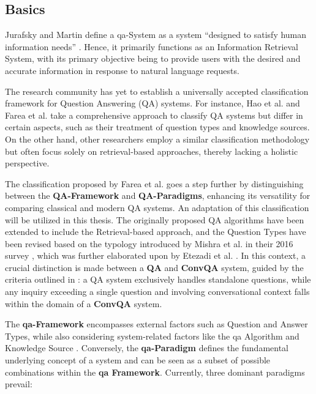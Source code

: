 \subsection{Basics}
\label{subsec:qa_basics}

Jurafsky and Martin define a \gls{qa}-System as a system \enquote{designed to satisfy human information needs} \cite{jurafsky_speech_2023}. Hence, it primarily functions as an Information Retrieval System, with its primary objective being to provide users with the desired and accurate information in response to natural language requests.

The research community has yet to establish a universally accepted classification framework for Question Answering (QA) systems. For instance, Hao et al. and Farea et al. \cite{hao_recent_2022, farea_evaluation_2022} take a comprehensive approach to classify QA systems but differ in certain aspects, such as their treatment of question types and knowledge sources. On the other hand, other researchers \cite{zhu_retrieving_2021, jurafsky_speech_2023, etezadi_state_2023, zhang_survey_2023} employ a similar classification methodology but often focus solely on retrieval-based approaches, thereby lacking a holistic perspective.

The classification proposed by Farea et al. \cite{farea_evaluation_2022} goes a step further by distinguishing between the \textbf{QA-Framework} and \textbf{QA-Paradigms}, enhancing its versatility for comparing classical and modern QA systems. An adaptation of this classification will be utilized in this thesis. The originally proposed QA algorithms have been extended to include the Retrieval-based approach, and the Question Types have been revised based on the typology introduced by Mishra et al. in their 2016 survey \cite{mishra_survey_2016}, which was further elaborated upon by Etezadi et al. \cite{etezadi_state_2023}. In this context, a crucial distinction is made between a \textbf{QA} and \textbf{ConvQA} system, guided by the criteria outlined in \cite{zamani_conversational_2023}: a QA system exclusively handles standalone questions, while any inquiry exceeding a single question and involving conversational context falls within the domain of a \textbf{ConvQA} system.

The \textbf{\gls{qa}-Framework} encompasses external factors such as Question and Answer Types, while also considering system-related factors like the \gls{qa} Algorithm and Knowledge Source \cite{farea_evaluation_2022, hao_recent_2022}. Conversely, the \textbf{\gls{qa}-Paradigm} defines the fundamental underlying concept of a system and can be seen as a subset of possible combinations within the \textbf{\gls{qa} Framework}. Currently, three dominant paradigms prevail:

